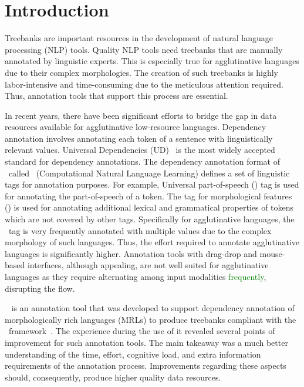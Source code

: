 \section{Introduction}
\label{sec:introduction}

Treebanks are important resources in the development of natural language processing (NLP) tools.
Quality NLP tools need treebanks that are manually annotated by linguistic experts.
This is especially true for agglutinative languages due to their complex morphologies.
The creation of such treebanks is highly labor-intensive and time-consuming due to the meticulous attention required.
Thus, annotation tools that support this process are essential.

In recent years, there have been significant efforts to bridge the gap in data resources available for agglutinative low-resource languages.
Dependency annotation involves annotating each token of a sentence with linguistically relevant values.
Universal Dependencies (UD)~\cite{UD} is the most widely accepted standard for dependency annotations.
The dependency annotation format of \ud\ called \conllu\ (Computational Natural Language Learning) defines a set of linguistic tags for annotation purposes.
For example, Universal part-of-speech (\upos) tag is used for annotating the part-of-speech of a token.
The tag for morphological features (\feats) is used for annotating additional lexical and grammatical properties of tokens which are not covered by other tags.
Specifically for agglutinative languages, the \feats\ tag is very frequently annotated with multiple values due to the complex morphology of such languages.
Thus, the effort required to annotate agglutinative languages is significantly higher.
Annotation tools with drag-drop and mouse-based interfaces, although appealing, are not well suited for agglutinative languages as they require alternating among input modalities \textcolor{green}{frequently}, disrupting the flow.

\boatvone~\cite{turk2021resources} is an annotation tool that was developed to support dependency annotation of morphologically rich languages (MRLs) to produce treebanks compliant with the \ud\ framework~\cite{UD}.
The experience during the use of it revealed several points of improvement for such annotation tools.
The main takeaway was a much better understanding of the time, effort, cognitive load, and extra information requirements of the annotation process.
Improvements regarding these aspects should, consequently, produce higher quality data resources.

